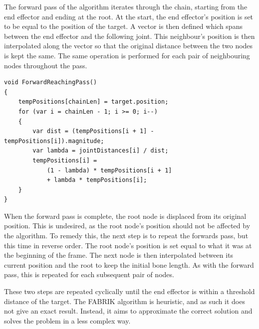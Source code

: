 The forward pass of the algorithm iterates through the chain, starting from the
end effector and ending at the root. At the start, the end effector's position
is set to be equal to the position of the target. A vector is then defined which
spans between the end effector and the following joint. This neighbour's position
is then interpolated along the vector so that the original distance between the
two nodes is kept the same. The same operation is performed for each pair of
neighbouring nodes throughout the pass. 

\begin{lstlisting}[basicstyle=\linespread{0.9}\footnotesize\ttfamily, numbers=none,frame=single,
caption={FABRIK forward reaching pass. \textit{Fabrik.cs}},captionpos=t, label=forwards, language={[Sharp]c}]
void ForwardReachingPass()
{
    tempPositions[chainLen] = target.position;
    for (var i = chainLen - 1; i >= 0; i--)
    {
        var dist = (tempPositions[i + 1] - tempPositions[i]).magnitude;
        var lambda = jointDistances[i] / dist;
        tempPositions[i] =
            (1 - lambda) * tempPositions[i + 1]
            + lambda * tempPositions[i];
    }
}
\end{lstlisting}

When the forward pass is complete, the root node is displaced from its original
position. This is undesired, as the root node's position should not be affected
by the algorithm. To remedy this, the next step is to repeat the forwards pass,
but this time in reverse order. The root node's position is set equal to what it was
at the beginning of the frame. The next node is then interpolated between its
current position and the root to keep the initial bone length. As with the
forward pass, this is repeated for each subsequent pair of nodes. 

These two steps are repeated cyclically until the end effector is within
a threshold distance of the target. The FABRIK algorithm is heuristic, and as
such it does not give an exact result. Instead, it aims to approximate the
correct solution and solves the problem in a less complex way.

